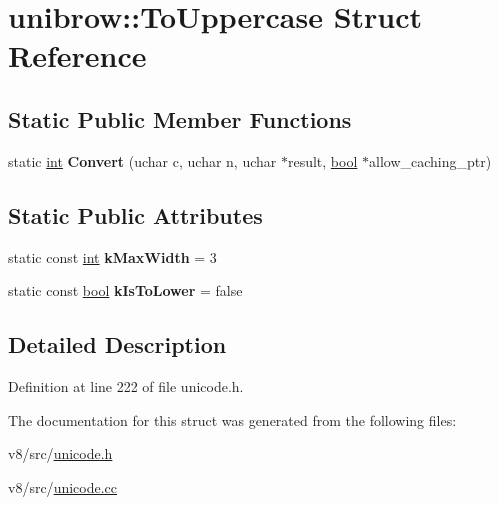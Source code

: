 \hypertarget{structunibrow_1_1ToUppercase}{}\section{unibrow\+:\+:To\+Uppercase Struct Reference}
\label{structunibrow_1_1ToUppercase}
\subsection*{Static Public Member Functions}
\begin{DoxyCompactItemize}
\item 
\mbox{\label{structunibrow_1_1ToUppercase_af0d9d46393e190811df7aee125999757}} 
static \mbox{\hyperlink{classint}{int}} {\bfseries Convert} (uchar c, uchar n, uchar $\ast$result, \mbox{\hyperlink{classbool}{bool}} $\ast$allow\+\_\+caching\+\_\+ptr)
\end{DoxyCompactItemize}
\subsection*{Static Public Attributes}
\begin{DoxyCompactItemize}
\item 
\mbox{\label{structunibrow_1_1ToUppercase_aeb0ac39ab96dff4ae331cee78b32a30f}} 
static const \mbox{\hyperlink{classint}{int}} {\bfseries k\+Max\+Width} = 3
\item 
\mbox{\label{structunibrow_1_1ToUppercase_a531f28567099ef97da4686bd9938ff54}} 
static const \mbox{\hyperlink{classbool}{bool}} {\bfseries k\+Is\+To\+Lower} = false
\end{DoxyCompactItemize}


\subsection{Detailed Description}


Definition at line 222 of file unicode.\+h.



The documentation for this struct was generated from the following files\+:\begin{DoxyCompactItemize}
\item 
v8/src/\mbox{\hyperlink{unicode_8h}{unicode.\+h}}\item 
v8/src/\mbox{\hyperlink{unicode_8cc}{unicode.\+cc}}\end{DoxyCompactItemize}

